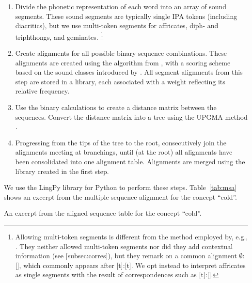 \documentclass[a4paper]{article}
\begin{document}
\begin{enumerate}
\item
Divide the phonetic representation of each word into an array of sound segments.
These sound segments are typically single IPA tokens (including diacritics), but we use multi-token segments for affricates, diph- and triphthongs, and geminates.
\footnote{
Allowing multi-token segments is different from
the method employed by, e.g., \citet{wieling2010hierarchical}.
They neither allowed multi-token segments nor did they add contextual information
(see \ref{subsec:corres}),
but they remark on a common alignment $\emptyset$:[\textesh],
which commonly appears after [t]:[t].
We opt instead to interpret affricates as single segments with
the result of correspondences such as [t]:[].

}

\item
Create alignments for all possible binary sequence combinations.
These alignments are created using the algorithm from \citet{needleman1970general},
with a scoring scheme based on the sound classes introduced by \citet{list2012sca}.
All segment alignments from this step are stored in a library,
each associated with a weight reflecting its relative frequency.

\item
Use the binary calculations to create a distance matrix between the sequences.
Convert the distance matrix into a tree using the UPGMA method \citep{sokal1958statistical}.

\item 
Progressing from the tips of the tree to the root,
consecutively join the alignments meeting at branchings,
until (at the root) all alignments have been consolidated into one alignment table.
Alignments are merged using the library created in the first step.
\end{enumerate}

We use the LingPy library for Python \citep{list2018lingpy} to perform these steps.
Table~\ref{tab:msa} shows an excerpt from the multiple sequence alignment for the concept ``cold''.

\begin{table}[h]
\begin{center}

\end{center}
\caption{An excerpt from the aligned sequence table for the concept ``cold''.}
\label{tab:msa}
\end{table}
\end{document}
